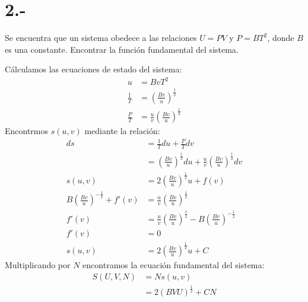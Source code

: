 \documentclass{article}
\begin{document}
\section*{2.-}
Se encuentra que un sistema obedece a las relaciones $U=PV$ y $P=BT^2$, donde $B$ es una constante.
Encontrar la función fundamental del sistema.
\begin{tcolorbox}
    Cálculamos las ecuaciones de estado del sistema:
    \begin{align*}
        u 
        &= BvT^2 \\
        \tfrac{1}{T}
        &= (\tfrac{Bv}{u})^{\frac{1}{2}} \\
        \tfrac{P}{T}
        &= \tfrac{u}{v}(\tfrac{Bv}{u})^{\frac{1}{2}} 
    \end{align*}
    Encontrmos $s(u,v)$ mediante la relación:
    \begin{align*}    
        ds
        &= \tfrac{1}{T}du + \tfrac{P}{T}dv \\
        &= (\tfrac{Bv}{u})^{\frac{1}{2}}du + \tfrac{u}{v}(\tfrac{Bv}{u})^{\frac{1}{2}}dv \\
        s(u,v)
        &= 2(\tfrac{Bv}{u})^{\frac{1}{2}}u + f(v) \\
        B(\tfrac{Bv}{u})^{-\frac{1}{2}} + f'(v) &= \tfrac{u}{v}(\tfrac{Bv}{u})^{\frac{1}{2}} \\
        f'(v) &= \tfrac{u}{v}(\tfrac{Bv}{u})^{\frac{1}{2}}-B(\tfrac{Bv}{u})^{-\frac{1}{2}} \\
        f'(v) &= 0 \\
        s(u,v) &= 2(\tfrac{Bv}{u})^{\frac{1}{2}}u+C 
    \end{align*}
    Multiplicando por $N$ encontramos la ecuación fundamental del sistema:
    \begin{align*}
        S(U,V,N) 
        &= Ns(u,v) \\
        &= 2(BVU)^{\frac{1}{2}}+CN 
    \end{align*}
\end{tcolorbox}
\end{document}
